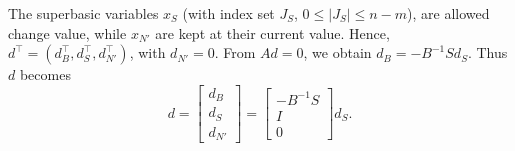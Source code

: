The superbasic variables $x_S$ (with index set $J_S$, $0 \leq |J_S| \leq n-m$), are allowed change value, while $x_{N'}$ are kept at their current value. Hence, $d^\top = (d_B^\top, d_S^\top, d_{N'}^\top)$, with $d_{N'} = 0$. From $Ad = 0$, we obtain $d_B = -B^{-1}Sd_S$. Thus $d$ becomes
$$d = \begin{bmatrix} d_B \\ d_S \\ d_{N'}
 
      \end{bmatrix} = 
      \begin{bmatrix} -B^{-1}S \\ I \\ 0
      
      \end{bmatrix}d_S. 
$$

